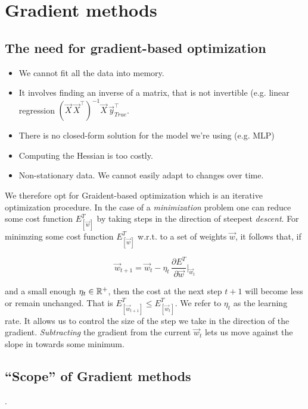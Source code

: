 \section{Gradient methods}

\subsection{The need for gradient-based optimization}

\begin{frame}






\begin{itemize}
	\item We cannot fit all the data into memory.
	\item It involves finding an inverse of a matrix, that is not invertible (e.g. linear regression $(\vec X \, \vec X^\top)^{-1}\vec X \, \vec y_{True}^\top$.
	\item There is no closed-form solution for the model we're using (e.g. MLP)
	\item Computing the Hessian is too costly.
	\item Non-stationary data. We cannot easily adapt to changes over time.
\end{itemize}

\end{frame}

We therefore opt for Graident-based optimization which is an iterative optimization procedure. 
In the case of a \emph{minimization} problem one can reduce some cost function $E^T_{[\vec w]}$ by taking steps in the direction of steepest \emph{descent}.
For minimzing some cost function $E^T_{[\vec w]}$ w.r.t. to a set of weights $\vec w$, it follows that, if

\begin{equation}
\vec w_{t+1} = \vec w_t - \eta_t \, \frac{\partial E^T}{\partial \vec w} \Bigg|_{\vec w_t}
\end{equation}

and a small enough $\eta_t \in \mathbb{R}^+$, then the cost at the next step $t+1$ will become less or remain unchanged. That is $E^T_{[\vec w_{t+1}]} \le E^T_{[\vec w_{t}]}$.
We refer to $\eta_t$ as the learning rate. It allows us to control the size of the step we take in the direction of the gradient.
\emph{Subtracting} the gradient from the current $\vec w_t$ lets us move against the slope in towards some minimum. 

\subsection{``Scope'' of Gradient methods}.


